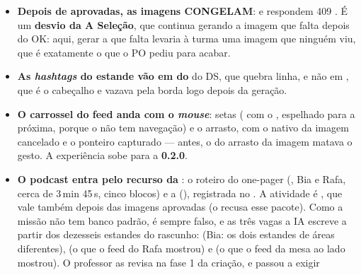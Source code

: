 \begin{itemize}
    A Seleção ():  aprova os textos e grava o
    pacote com  nulo; o professor vê a grade dos
    dezesseis estandes na página da atividade, gera outra imagem para o que
    não serve (,
    um arquivo NOVO e sempre pago) e aprova
    (, idempotente). Sem a
    segunda fase, pôr no ar responde 409 . Não se
    exige imagem em todo estande: a geração falha e a quota acaba, e o
    estande sem imagem segue com a arte desenhada, que a grade mostra antes
    do clique. Os pacotes que já existiam entraram aprovados na migração.
  \item \textbf{Depois de aprovadas, as imagens CONGELAM}: 
    e  respondem 409 . É um
    \textbf{desvio da A Seleção}, que continua gerando a imagem que falta
    depois do OK: aqui, gerar a que falta levaria à turma uma imagem que
    ninguém viu, que é exatamente o que o PO pediu para acabar.
  \item \textbf{As \emph{hashtags} do estande vão em  do
    } do DS, que quebra linha, e não em , que é o cabeçalho
    e vazava pela borda logo depois da geração.
  \item \textbf{O carrossel do feed anda com o \emph{mouse}}: setas
    ( com o  , espelhado para a próxima,
    porque o  não tem navegação) e o arrasto, com o
     nativo da imagem cancelado e o ponteiro capturado --- antes,
    o  do arrasto da imagem matava o gesto. A experiência
    sobe para a \textbf{0.2.0}.
  \item \textbf{O podcast entra pelo recurso da }: o roteiro do
    one-pager (, Bia e Rafa, cerca de
    3\,min 45\,s, cinco blocos) e a 
    (), registrada no . A atividade é
    , que vale também depois das imagens aprovadas (o
     recusa esse pacote). Como a missão não tem banco
    padrão,  é sempre falso, e as três vagas a IA escreve a partir
    dos dezesseis estandes do rascunho:  (Bia: os dois estandes de
    áreas diferentes),  (o que o feed do Rafa mostrou) e  (o
    que o feed da mesa ao lado mostrou). O professor as revisa na fase 1 da
    criação, e  passou a exigir 
\end{itemize}

